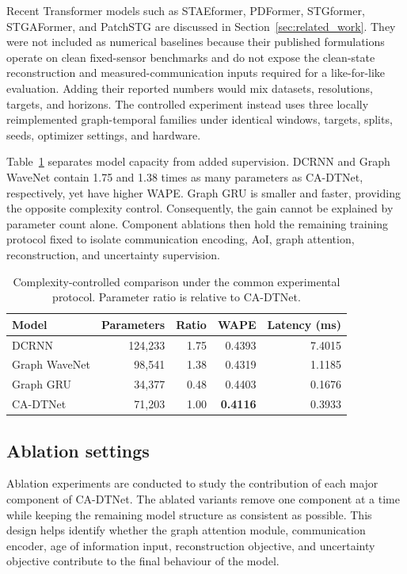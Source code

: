 \documentclass[pdflatex,sn-mathphys-num]{sn-jnl}%
\newenvironment{changed}{\color{blue}}{}
\theoremstyle{thmstyleone}%
\theoremstyle{thmstyletwo}%
\theoremstyle{thmstylethree}%
\begin{document}
\begin{changed}
Recent Transformer models such as STAEformer, PDFormer, STGformer, STGAFormer, and PatchSTG are discussed in Section~\ref{sec:related_work}. They were not included as numerical baselines because their published formulations operate on clean fixed-sensor benchmarks and do not expose the clean-state reconstruction and measured-communication inputs required for a like-for-like evaluation. Adding their reported numbers would mix datasets, resolutions, targets, and horizons. The controlled experiment instead uses three locally reimplemented graph-temporal families under identical windows, targets, splits, seeds, optimizer settings, and hardware.

Table~\ref{tab:complexity_control} separates model capacity from added supervision. DCRNN and Graph WaveNet contain 1.75 and 1.38 times as many parameters as CA-DTNet, respectively, yet have higher WAPE. Graph GRU is smaller and faster, providing the opposite complexity control. Consequently, the gain cannot be explained by parameter count alone. Component ablations then hold the remaining training protocol fixed to isolate communication encoding, AoI, graph attention, reconstruction, and uncertainty supervision.

\begin{table}[!htbp]
\caption{Complexity-controlled comparison under the common experimental protocol. Parameter ratio is relative to CA-DTNet.}
\label{tab:complexity_control}
\centering
\footnotesize
\begin{tabular}{lrrrr}
\toprule
Model & Parameters & Ratio & WAPE & Latency (ms) \\
\midrule
DCRNN & 124,233 & 1.75 & 0.4393 & 7.4015 \\
Graph WaveNet & 98,541 & 1.38 & 0.4319 & 1.1185 \\
Graph GRU & 34,377 & 0.48 & 0.4403 & 0.1676 \\
CA-DTNet & 71,203 & 1.00 & \textbf{0.4116} & 0.3933 \\
\bottomrule
\end{tabular}
\end{table}
\end{changed}

\subsection{Ablation settings}
\label{subsec:ablation_settings}

Ablation experiments are conducted to study the contribution of each major component of CA-DTNet. The ablated variants remove one component at a time while keeping the remaining model structure as consistent as possible. This design helps identify whether the graph attention module, communication encoder, age of information input, reconstruction objective, and uncertainty objective contribute to the final behaviour of the model.
\end{document}

